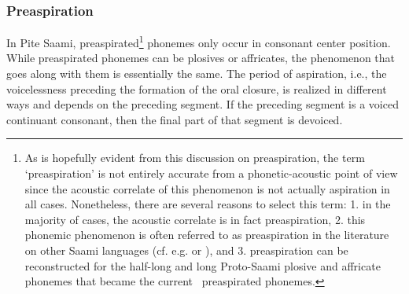 \subsubsection{Preaspiration}\label{preaspiration}\noindent
In Pite Saami, preaspirated\footnote{As is hopefully evident from this discussion on preaspiration, the term ‘preaspiration’ is not entirely accurate from a phonetic-acoustic point of view since the acoustic correlate of this phenomenon is not actually aspiration in all cases. Nonetheless, there are several reasons to select this term: 1. in the majority of cases, the acoustic correlate is in fact preaspiration, 2. this phonemic phenomenon is often referred to as preaspiration in the literature on %
other Saami languages (cf. e.g. \citealt[54-55]{Sammallahti1998} %
or \citealt[57,67]{Feist2010}), and 3. preaspiration can be reconstructed for the half-long and long Proto-Saami plosive and affricate phonemes \citep[cf.][54]{Sammallahti1998} that became the current \PS\ preaspirated phonemes.} 
phonemes only occur in consonant center position. While preaspirated phonemes can be plosives or affricates, the phenomenon that goes along with them is essentially the same. %
The period of aspiration, i.e., the voicelessness preceding the formation of the oral closure, is realized in different ways and depends on the preceding segment. If the preceding segment is a voiced continuant %
consonant, then the final part of that segment is devoiced. 

